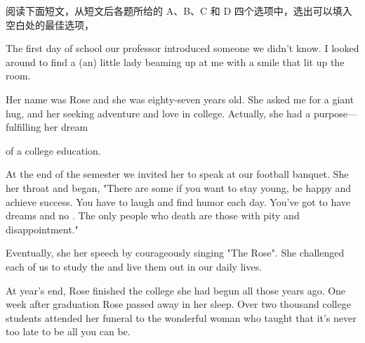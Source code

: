 \documentclass{英语试卷}
\begin{document}
\par 阅读下面短文，从短文后各题所给的 A、B、C 和 D 四个选项中，选出可以填入空白处的最佳选项，\par
\par The first day of school our professor introduced someone we didn't know. I looked around to find a (an)  little lady beaming up at me with a smile that lit up the room.\par
\par Her name was Rose and she was eighty-seven years old. She  asked me for a giant hug, and  her seeking adventure and love in college. Actually, she had a  purpose— fulfilling her dream\par
\par of a college education.\par
\par At the end of the semester we invited her to speak at our football banquet. She  her throat and began, "There are some  if you want to stay young, be happy and achieve success. You have to laugh and find humor each day. You've got to have dreams and no . The only people who  death are those with pity and disappointment."\par
\par Eventually, she  her speech by courageously singing "The Rose". She challenged each of us to study the  and live them out in our daily lives.\par
\par At year's end, Rose finished the college  she had begun all those years ago. One week after graduation Rose passed away  in her sleep. Over two thousand college students attended her funeral to  the wonderful woman who taught  that it's never too late to be all you can  be.\par
{}
\end{document}
